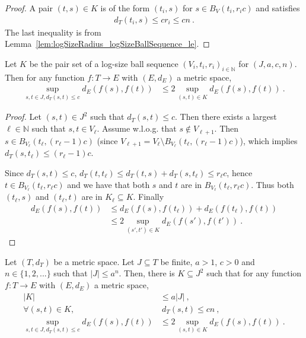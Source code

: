 \begin{proof}
A pair $(t, s) \in K$ is of the form $(t_i, s)$ for $s \in B_V(t_i, r_i c)$ and satisfies
\begin{align*}
  d_T(t_i, s) \le c r_i \le c n \: .
\end{align*}
The last inequality is from Lemma~\ref{lem:logSizeRadius_logSizeBallSequence_le}.
\end{proof}


\begin{lemma}\label{lem:sup_dist_le_two_mul_sup_dist_pairSet}
  \leanok
Let $K$ be the pair set of a log-size ball sequence $(V_i, t_i, r_i)_{i \in \mathbb{N}}$ for $(J, a, c, n)$.
Then for any function $f : T \to E$ with $(E,d_E)$ a metric space,
\begin{align*}
  \sup_{s,t\in J, d_T(s,t) \le c} d_E(f(s), f(t))
  & \le 2 \sup_{(s,t) \in K} d_E(f(s), f(t))
  \: .
\end{align*}
\end{lemma}

\begin{proof}
Let $(s, t) \in J^2$ such that $d_T(s, t) \le c$.
Then there exists a largest $\ell \in \mathbb{N}$ such that $s, t \in V_\ell$.
Assume w.l.o.g. that $s \notin V_{\ell + 1}$. Then $s \in B_{V_\ell}(t_\ell, (r_\ell-1)c)$ (since $V_{\ell + 1} = V_\ell \setminus B_{V_\ell}(t_\ell, (r_\ell-1)c)$), which implies $d_T(s, t_\ell) \le (r_\ell - 1)c$.

Since $d_T(s, t) \le c$, $d_T(t, t_\ell) \le d_T(t, s) + d_T(s, t_\ell) \le r_\ell c$, hence $t \in B_{V_\ell}(t_\ell, r_\ell c)$ and we have that both $s$ and $t$ are in $B_{V_\ell}(t_\ell, r_\ell c)$.
Thus both $(t_\ell, s)$ and $(t_\ell, t)$ are in $K_\ell \subseteq K$.
Finally
\begin{align*}
  d_E(f(s), f(t))
  &\le d_E(f(s), f(t_\ell)) + d_E(f(t_\ell), f(t))
  \\
  &\le 2\sup_{(s',t') \in K} d_E(f(s'), f(t'))
  \: .
\end{align*}
\end{proof}


\begin{lemma}\label{lem:pair_reduction}
  \leanok
Let $(T,d_T)$ be a metric space.
Let $J \subseteq T$ be finite, $a > 1$, $c>0$ and $n \in \{1, 2, ...\}$ such that $|J| \le a^n$.
Then, there is $K \subseteq J^2$ such that for any function $f : T \to E$ with $(E,d_E)$ a metric space,
\begin{align}
  |K|
  & \le a |J|
  \:, \label{eq:chain1} \\
  \forall (s,t) \in K,
  &\:  d_T(s,t) \le c n
  \:, \label{eq:chain2} \\
  \sup_{s,t\in J, d_T(s,t) \le c} d_E(f(s), f(t))
  & \le 2 \sup_{(s,t) \in K} d_E(f(s), f(t))
  \: . \label{eq:chain3}
\end{align}
\end{lemma}

